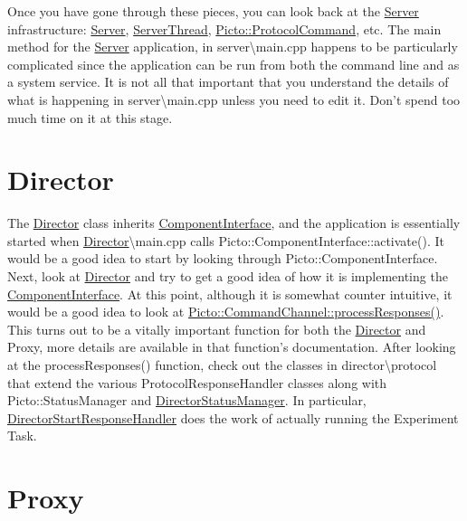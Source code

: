Once you have gone through these pieces, you can look back at the \hyperlink{class_server}{Server} infrastructure\-: \hyperlink{class_server}{Server}, \hyperlink{class_server_thread}{Server\-Thread}, \hyperlink{struct_picto_1_1_protocol_command}{Picto\-::\-Protocol\-Command}, etc. The main method for the \hyperlink{class_server}{Server} application, in server\textbackslash{}main.\-cpp happens to be particularly complicated since the application can be run from both the command line and as a system service. It is not all that important that you understand the details of what is happening in server\textbackslash{}main.\-cpp unless you need to edit it. Don't spend too much time on it at this stage.\hypertarget{first_code_look_first_look_Director}{}\section{Director}\label{first_code_look_first_look_Director}
The \hyperlink{class_director}{Director} class inherits \hyperlink{class_component_interface}{Component\-Interface}, and the application is essentially started when \hyperlink{class_director}{Director}\textbackslash{}main.\-cpp calls Picto\-::\-Component\-Interface\-::activate(). It would be a good idea to start by looking through Picto\-::\-Component\-Interface. Next, look at \hyperlink{class_director}{Director} and try to get a good idea of how it is implementing the \hyperlink{class_component_interface}{Component\-Interface}. At this point, although it is somewhat counter intuitive, it would be a good idea to look at \hyperlink{class_picto_1_1_command_channel_aafe619791fb542563544ecf50628238b}{Picto\-::\-Command\-Channel\-::process\-Responses()}. This turns out to be a vitally important function for both the \hyperlink{class_director}{Director} and Proxy, more details are available in that function's documentation. After looking at the process\-Responses() function, check out the classes in director\textbackslash{}protocol that extend the various Protocol\-Response\-Handler classes along with Picto\-::\-Status\-Manager and \hyperlink{class_director_status_manager}{Director\-Status\-Manager}. In particular, \hyperlink{struct_director_start_response_handler}{Director\-Start\-Response\-Handler} does the work of actually running the Experiment Task.\hypertarget{first_code_look_first_look_Proxy}{}\section{Proxy}\label{first_code_look_first_look_Proxy}
